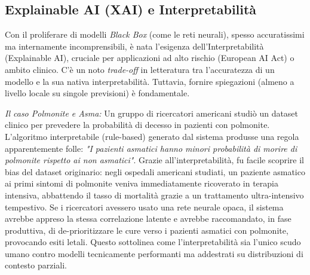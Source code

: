 \subsection{Explainable AI (XAI) e Interpretabilità}
Con il proliferare di modelli \textit{Black Box} (come le reti neurali), spesso accuratissimi ma internamente incomprensibili, è nata l'esigenza dell'Interpretabilità (Explainable AI), cruciale per applicazioni ad alto rischio (European AI Act) o ambito clinico.
C'è un noto \textit{trade-off} in letteratura tra l'accuratezza di un modello e la sua nativa interpretabilità. Tuttavia, fornire spiegazioni (almeno a livello locale su singole previsioni) è fondamentale.

\textit{Il caso Polmonite e Asma:} Un gruppo di ricercatori americani studiò un dataset clinico per prevedere la probabilità di decesso in pazienti con polmonite. L'algoritmo interpretabile (rule-based) generato dal sistema produsse una regola apparentemente folle: \textit{"I pazienti asmatici hanno minori probabilità di morire di polmonite rispetto ai non asmatici"}.
Grazie all'interpretabilità, fu facile scoprire il bias del dataset originario: negli ospedali americani studiati, un paziente asmatico ai primi sintomi di polmonite veniva immediatamente ricoverato in terapia intensiva, abbattendo il tasso di mortalità grazie a un trattamento ultra-intensivo tempestivo. Se i ricercatori avessero usato una rete neurale opaca, il sistema avrebbe appreso la stessa correlazione latente e avrebbe raccomandato, in fase produttiva, di de-prioritizzare le cure verso i pazienti asmatici con polmonite, provocando esiti letali. Questo sottolinea come l'interpretabilità sia l'unico scudo umano contro modelli tecnicamente performanti ma addestrati su distribuzioni di contesto parziali.